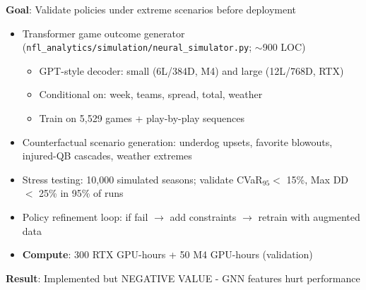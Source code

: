 \textbf{Goal}: Validate policies under extreme scenarios before deployment

\begin{itemize}
  \item {} Transformer game outcome generator (\texttt{nfl\_analytics/simulation/neural\_simulator.py}; $\sim$900 LOC)
  \begin{itemize}
    \item GPT-style decoder: small (6L/384D, M4) and large (12L/768D, RTX)
    \item Conditional on: week, teams, spread, total, weather
    \item Train on 5,529 games + play-by-play sequences
  \end{itemize}
  \item {} Counterfactual scenario generation: underdog upsets, favorite blowouts, injured-QB cascades, weather extremes
  \item {} Stress testing: 10,000 simulated seasons; validate CVaR$_{95} <$ 15\%, Max DD $<$ 25\% in 95\% of runs
  \item {} Policy refinement loop: if fail $\to$ add constraints $\to$ retrain with augmented data
  \item \textbf{Compute}: 300 RTX GPU-hours + 50 M4 GPU-hours (validation)
\end{itemize}

\textbf{Result}: Implemented but NEGATIVE VALUE - GNN features hurt performance

